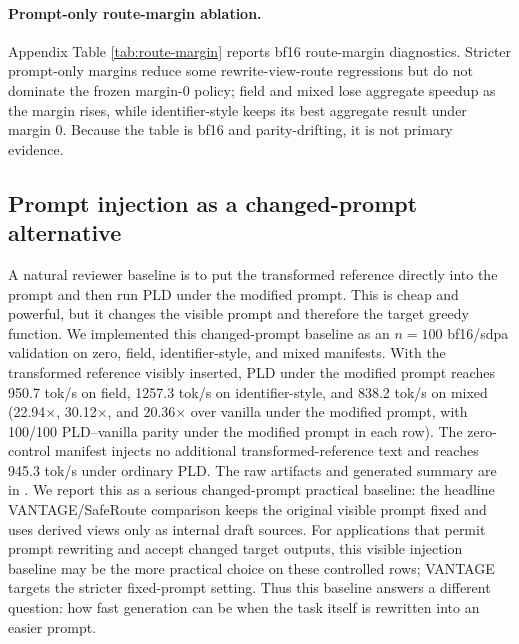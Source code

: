 \documentclass[11pt,a4paper]{article}
\begin{document}
\paragraph{Prompt-only route-margin ablation.}
Appendix Table \ref{tab:route-margin} reports bf16 route-margin diagnostics.
Stricter prompt-only margins reduce some rewrite-view-route regressions but do
not dominate the frozen margin-0 policy; field and mixed lose aggregate
speedup as the margin rises, while identifier-style keeps its best aggregate
result under margin 0. Because the table is bf16 and parity-drifting, it is not
primary evidence.

\subsection{Prompt injection as a changed-prompt alternative}
A natural reviewer baseline is to put the transformed reference directly
into the prompt and then run PLD under the modified prompt. This is cheap and powerful, but
it changes the visible prompt and therefore the target greedy function.
We implemented this changed-prompt baseline as an $n=100$ bf16/sdpa validation on
zero, field, identifier-style, and mixed manifests. With the transformed reference
visibly inserted, PLD under the modified prompt reaches 950.7 tok/s on field, 1257.3 tok/s
on identifier-style, and 838.2 tok/s on mixed (22.94$\times$, 30.12$\times$, and
20.36$\times$ over vanilla under the modified prompt, with 100/100
PLD--vanilla parity under the modified prompt in each row). The zero-control manifest injects no
additional transformed-reference text and reaches 945.3 tok/s under ordinary PLD. The raw
artifacts and generated summary are in
.
We report this as a serious changed-prompt practical baseline: the headline
VANTAGE/SafeRoute comparison keeps the original visible prompt fixed and uses derived
views only as internal draft sources. For applications that
permit prompt rewriting and accept changed target outputs, this visible
injection baseline may be the more practical choice on these controlled rows;
VANTAGE targets the stricter fixed-prompt setting. Thus this baseline answers a
different question: how fast generation can be when the task itself is rewritten
into an easier prompt.
\end{document}
